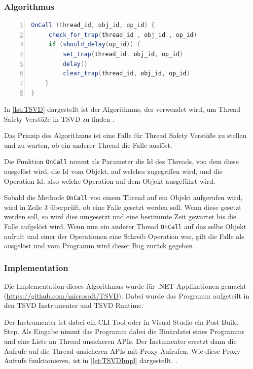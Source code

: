 \subsubsection*{Algorithmus}

\begin{lstlisting}[language=Java,frame=tb,caption={\acs{TSVD} Trap Mechanism}, label={lst:TSVD}, numbers=left, stepnumber=1,  captionpos=b]
OnCall (thread_id, obj_id, op_id) { 
     check_for_trap(thread_id , obj_id , op_id) 
     if (should_delay(op_id)) {
         set_trap(thread_id, obj_id, op_id)
         delay()
         clear_trap(thread_id, obj_id, op_id)
    }
}
\end{lstlisting}

In \ref{lst:TSVD} dargestellt ist der Algorithmus, der verwendet wird, um Thread Safety Verstöße in \acs{TSVD} zu finden \cite[Figure 5,][166]{li_efficient_2019}. 

Das Prinzip des Algorithmus ist eine Falle für Thread Safety Verstöße zu stellen und zu warten, ob ein anderer Thread die Falle auslöst. 

Die Funktion \texttt{OnCall} nimmt als Parameter die Id des Threads, von dem diese ausgelöst wird, die Id vom Objekt, auf welches zugegriffen wird, und die Operation Id, also welche Operation auf dem Objekt ausgeführt wird.

Sobald die Methode \texttt{OnCall} von einem Thread auf ein Objekt aufgerufen wird, wird in Zeile 3 überprüft, ob eine Falle gesetzt werden soll. Wenn diese gesetzt werden soll, so wird dies umgesetzt und eine bestimmte Zeit gewartet bis die Falle aufgelöst wird. Wenn nun ein anderer Thread \texttt{OnCall} auf das selbe Objekt aufruft und einer der Operationen eine Schreib Operation war, gilt die Falle als ausgelöst und vom Programm wird dieser Bug zurück gegeben \cite[vgl.][166]{li_efficient_2019}.

\subsubsection*{Implementation}

Die Implementation dieses Algorithmus wurde für .NET Applikationen gemacht (\url{https://github.com/microsoft/TSVD}). Dabei wurde das Programm aufgeteilt in den \acs{TSVD} Instrumenter und \acs{TSVD} Runtime.  

Der Instrumenter ist dabei ein \ac{CLI} Tool oder in Visual Studio ein Post-Build Step. Als Eingabe nimmt das Programm dabei die Binärdatei eines Programms und eine Liste an Thread unsicheren \ac{API}s. Der Instumenter ersetzt dann die Aufrufe auf die Thread unsicheren \acs{API}s mit Proxy Aufrufen. Wie diese Proxy Aufrufe funktionieren, ist in \ref{lst:TSVDImpl} dargestellt. \cite[vgl.][170]{li_efficient_2019}.


